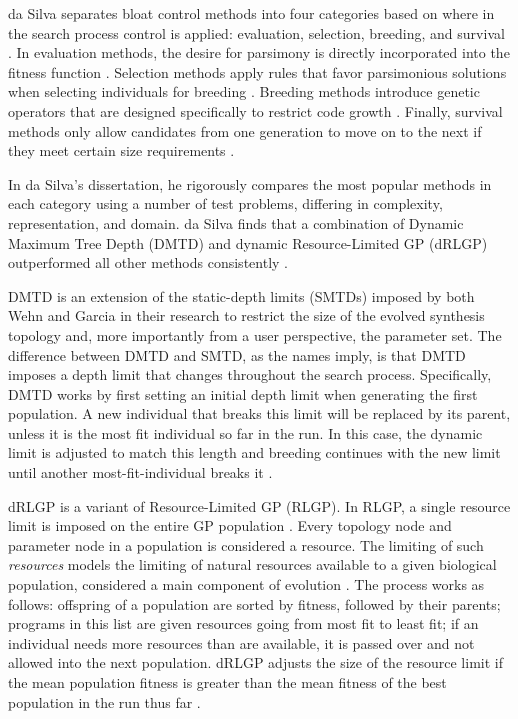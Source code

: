 \documentclass[a4paper,12pt]{report} 	%
\numberwithin{figure}{chapter}
\numberwithin{table}{chapter}
\numberwithin{equation}{chapter}
\begin{document}
\begin{flushleft}
da Silva separates bloat control methods into four categories based on where in the search process control is applied: evaluation, selection, breeding, and survival \cite[p. 11]{Silva:2008le}. In evaluation methods, the desire for parsimony is directly incorporated into the fitness function \cite[p. 11]{Silva:2008le}. Selection methods apply rules that favor parsimonious solutions when selecting individuals for breeding \cite[p. 12]{Silva:2008le}. Breeding methods introduce genetic operators that are designed specifically to restrict code growth \cite[p. 12]{Silva:2008le}. Finally, survival methods only allow candidates from one generation to move on to the next if they meet certain size requirements \cite[p. 12]{Silva:2008le}. 

In da Silva's dissertation, he rigorously compares the most popular methods in each category using a number of test problems, differing in complexity, representation, and domain. da Silva finds that a combination of Dynamic Maximum Tree Depth (DMTD) and dynamic Resource-Limited GP (dRLGP) outperformed all other methods consistently \cite[p. 86]{Silva:2008le}. 

DMTD is an extension of the static-depth limits (SMTDs) imposed by both Wehn \cite{Wehn:1998bh} and Garcia  \cite{Garcia:2002cq} in their research to restrict the size of the evolved synthesis topology and, more importantly from a user perspective, the parameter set. The difference between DMTD and SMTD, as the names imply, is that DMTD imposes a depth limit that changes throughout the search process. Specifically, DMTD works by first setting an initial depth limit when generating the first population. A new individual that breaks this limit will be replaced by its parent, unless it is the most fit individual so far in the run. In this case, the dynamic limit is adjusted to match this length and breeding continues with the new limit until another most-fit-individual breaks it \cite[p. 17]{Silva:2008le}.

dRLGP is a variant of Resource-Limited GP (RLGP). In RLGP, a single resource limit is imposed on the entire GP population \cite[p. 21]{Silva:2008le}. Every topology node and parameter node in a population is considered a resource. The limiting of such \emph{resources} models the limiting of natural resources available to a given biological population, considered a main component of evolution \cite[p. 21]{Silva:2008le}. The process works as follows: offspring of a population are sorted by fitness, followed by their parents; programs in this list are given resources going from most fit to least fit; if an individual needs more resources than are available, it is passed over and not allowed into the next population. dRLGP adjusts the size of the resource limit if the mean population fitness is greater than the mean fitness of the best population in the run thus far \cite[p. 22]{Silva:2008le}. 


\end{flushleft}
\end{document}

